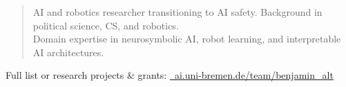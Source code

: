 \documentclass[10pt,a4paper,normalphoto]{../template/altacv}
\begin{document}

\begin{fullwidth}
\makecvheader
\end{fullwidth}

\vspace{-5pt}

\begin{quote}
\begin{center}
AI and robotics researcher transitioning to AI safety. Background in political science, CS, and robotics.\\Domain expertise in neurosymbolic AI, robot learning, and interpretable AI architectures.
\end{center}
\end{quote}








Full list or research projects \& grants: \href{https://ai.uni-bremen.de/team/benjamin_alt}{\faLink~ai.uni-bremen.de/team/benjamin\_alt}
% 



% 




\end{document}
